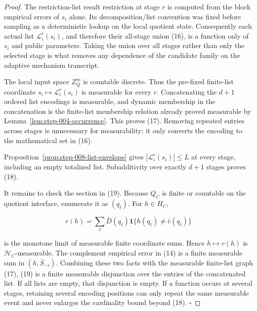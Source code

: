 \begin{proof}
The restriction-list result restriction at stage \(r\) is computed from the
block empirical errors of \(s_i\) alone. Its decomposition/list convention
was fixed before sampling as a deterministic lookup on the local quotient
state. Consequently each actual list \(\mathcal L_i^r(s_i)\), and therefore
their all-stage union (16), is a function only of \(s_i\) and public
parameters. Taking the union over all stages rather than only the selected
stage is what removes any dependence of the candidate family on the
adaptive mechanism transcript.

The local input space \(Z_Q^m\) is countable discrete. Thus the pre-fixed
finite-list coordinate \(s_i\mapsto\mathcal L_i^r(s_i)\) is measurable for
every \(r\). Concatenating the \(d+1\) ordered list encodings is measurable,
and dynamic membership in the concatenation is the finite-list membership
relation already proved measurable by Lemma~\ref{lem:step-004-occurrence}.
This proves (17). Removing repeated entries across stages is unnecessary
for measurability; it only converts the encoding to the mathematical set in
(16).

Proposition~\ref{prop:step-008-list-envelope} gives
\(|\mathcal L_i^r(s_i)|\leq L\) at every stage, including an empty
totalized list. Subadditivity over exactly \(d+1\) stages proves (18).

It remains to check the section in (19). Because \(Q_C\) is finite or
countable on the  quotient interface, enumerate it as
\((q_\ell)\). For \(h\in H_C\),

\[
 r(h)=\sum_{\ell}\bar D(q_\ell)
       \mathbf1\{h(q_\ell)\ne\bar c(q_\ell)\}
 \tag{20}
\]

is the monotone limit of measurable finite coordinate sums. Hence
\(h\mapsto r(h)\) is \(\mathcal H_C\)-measurable. The complement empirical
error in (14) is a finite measurable sum in \((h,\bar S_{-i})\). Combining
these two facts with the measurable finite-list graph (17), (19) is a
finite measurable disjunction over the entries of the concatenated list.
If all lists are empty, that disjunction is empty. If a function occurs at
several stages, retaining several encoding positions can only repeat the
same measurable event and never enlarges the cardinality bound beyond
(18). \(\square\)


\end{proof}

